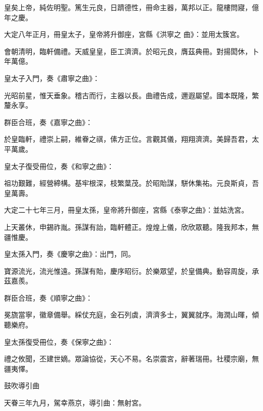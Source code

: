 \begin{pinyinscope}
 皇矣上帝，純佐明聖。篤生元良，日躋德性，冊命主器，萬邦以正。龍樓問寢，億年之慶。



 大定八年正月，冊皇太子，皇帝將升御座，宮縣《洪寧之
 曲》：並用太簇宮。



 會朝清明，臨軒備禮。天威皇皇，臣工濟濟。於昭元良，膺茲典冊。對揚閎休，卜年萬億。



 皇太子入門，奏《肅寧之曲》：



 光昭前星，惟天垂象。稽古而行，主器以長。曲禮告成，邇遐屬望。國本既隆，繁釐永享。



 群臣合班，奏《嘉寧之曲》：



 於皇臨軒，禮崇上嗣，維眷之祺，傃方正位。言觀其儀，翔翔濟濟。美歸吾君，太平萬歲。



 皇太子復受冊位，奏《和寧之曲》：



 祖功艱難，經營締構。基牢根深，枝繁葉茂。於昭貽謀，駢休集祐。元良斯貞，吾皇萬壽。



 大定二十七年三月，冊皇太孫，皇帝將升御座，宮縣《泰寧之曲》：並姑洗宮。



 上天叢休，申錫祚胤。孫謀有詒，臨軒體正。煌煌上儀，欣欣眾聽。隆我邦本，無疆惟慶。



 皇太孫入門，奏《慶寧之曲》：出門，同。



 寶源流光，流光惟遠。孫謀有貽，慶序昭衍。於樂眾望，於皇備典。動容周旋，承茲嘉羨。



 群臣合班，奏《順寧之曲》：



 冕旒當寧，徽章備舉。綵仗充庭，金石列虡，濟濟多士，翼翼就序。海潤山暉，傾聽樂府。



 皇太孫復受冊位，奏《保寧之曲》：



 禮之攸聞，丕建世嫡。眾論協從，天心不易。名崇震宮，辭著瑞冊。社稷宗廟，無疆夷懌。



 鼓吹導引曲



 天眷三年九月，駕幸燕京，導引曲：無射宮。




\end{pinyinscope}
